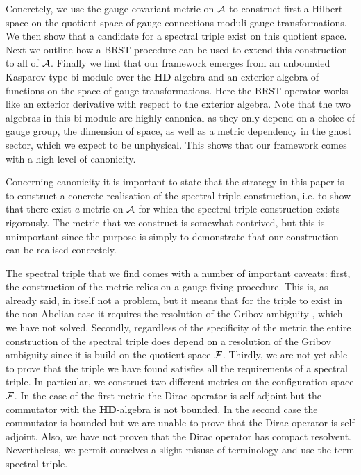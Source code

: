 \documentclass[letterpaper,12pt]{article}
\def\ca{{\cal A}}
\def\cf{{\cal F}}
\begin{document}
Concretely, we use the gauge covariant metric on $\ca$ to construct first a Hilbert space on the quotient space of gauge connections moduli gauge transformations. We then show that a candidate for a spectral triple exist on this quotient space. Next we outline how a BRST procedure \cite{Becchi:1975nq,Tyutin:1975qk,Barnich:2000zw,Henneaux:1992ig} can be used to extend this construction to all of $\ca$. Finally we find that our framework emerges from an unbounded Kasparov type bi-module over the $\mathbf{HD}$-algebra and an exterior algebra of functions on the space of gauge transformations. Here the BRST operator works like an exterior derivative with respect to the exterior algebra. Note that the two algebras in this bi-module are highly canonical as they only depend on a choice of gauge group, the dimension of space, as well as a metric dependency in the ghost sector, which we expect to be unphysical. This shows that our framework comes with a high level of canonicity. 

 
 
Concerning canonicity it is important to state that the strategy in this paper is to construct a concrete realisation of the spectral triple construction, i.e. to show that there exist {\it a} metric on $\ca$ for which the spectral triple construction exists rigorously. The metric that we construct is somewhat contrived, but this is unimportant since the purpose is simply to demonstrate that our construction can be realised concretely. 



The spectral triple that we find comes with a number of important caveats: 
first, the construction of the metric relies on a gauge fixing procedure. This is, as already said, in itself not a problem, but it means that for the triple to exist in the non-Abelian case it requires the resolution of the Gribov ambiguity \cite{Gribov:1977wm,Singer:1978dk}, which we have not solved. Secondly, regardless of the specificity of the metric the entire construction of the spectral triple does depend on a resolution of the Gribov ambiguity since it is build on the quotient space $\cf$.  Thirdly, we are not yet able to prove that the triple we have found satisfies all the requirements of a spectral triple. In particular, we construct two different metrics on the configuration space $\cf$. In the case of the first metric the Dirac operator is self adjoint but the commutator with the $\mathbf{HD}$-algebra is not bounded. In the second case the commutator is bounded but we are unable to prove that the Dirac operator is self adjoint. Also, we have not proven that the Dirac operator has compact resolvent. Nevertheless, we permit ourselves a slight misuse of terminology and use the term spectral triple.
\end{document}

